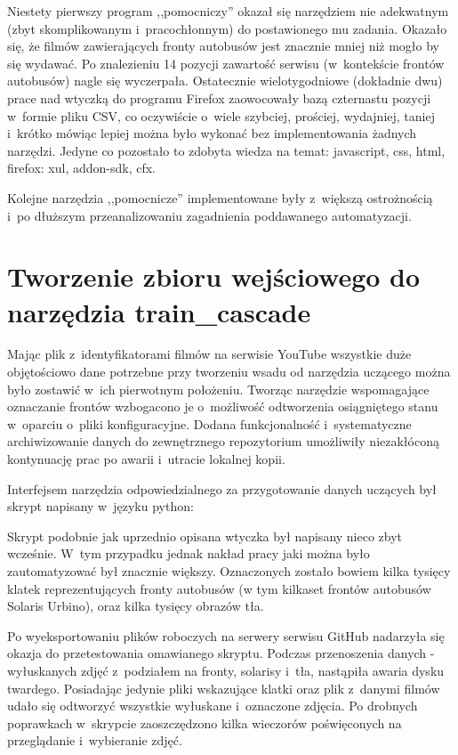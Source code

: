 Niestety pierwszy program ,,pomocniczy'' okazał się narzędziem nie
adekwatnym
(zbyt skomplikowanym i~pracochłonnym) do postawionego mu zadania. 
Okazało się, że
filmów zawierających fronty autobusów jest znacznie mniej niż mogło 
by się wydawać. Po znalezieniu 14 pozycji zawartość serwisu 
(w~kontekście frontów autobusów) nagle się
wyczerpała. Ostatecznie wielotygodniowe (dokładnie dwu) prace nad 
wtyczką do programu 
Firefox zaowocowały bazą czternastu pozycji w~formie pliku CSV,
co oczywiście o~wiele szybciej, prościej, wydajniej, taniej i~krótko 
mówiąc lepiej można
było wykonać bez implementowania żadnych narzędzi. 
Jedyne co pozostało to zdobyta wiedza
na temat: javascript, css, html, firefox: xul, addon-sdk, cfx. 

Kolejne narzędzia ,,pomocnicze'' implementowane były z~większą 
ostrożnością i~po
dłuższym przeanalizowaniu zagadnienia poddawanego automatyzacji.

\section{Tworzenie zbioru wejściowego do narzędzia train\_cascade}

Mając plik z~identyfikatorami filmów na serwisie YouTube wszystkie duże objętościowo
dane potrzebne przy tworzeniu wsadu od narzędzia uczącego można było zostawić
w~ich pierwotnym położeniu. Tworząc narzędzie wspomagające oznaczanie frontów
wzbogacono je o~możliwość odtworzenia osiągniętego stanu w~oparciu o~pliki konfiguracyjne.
Dodana funkcjonalność i~systematyczne archiwizowanie danych do zewnętrznego repozytorium
umożliwiły niezakłóconą kontynuację prac po awarii i~utracie lokalnej kopii.

Interfejsem narzędzia odpowiedzialnego za przygotowanie danych uczących był skrypt
napisany w~języku python:



Skrypt podobnie jak uprzednio opisana wtyczka był napisany 
nieco zbyt wcześnie. W~tym przypadku jednak nakład pracy jaki 
można było zautomatyzować był znacznie większy. Oznaczonych zostało 
bowiem kilka tysięcy klatek reprezentujących fronty autobusów
(w tym kilkaset frontów autobusów Solaris Urbino), oraz kilka tysięcy
obrazów tła. 

Po wyeksportowaniu plików roboczych na serwery serwisu GitHub
nadarzyła się okazja do przetestowania omawianego skryptu.
Podczas przenoszenia danych - wyłuskanych 
zdjęć z~podziałem na fronty, solarisy i~tła, nastąpiła awaria dysku
twardego. Posiadając jedynie pliki wskazujące klatki oraz plik 
z~danymi filmów udało się odtworzyć wszystkie wyłuskane i~oznaczone
zdjęcia. Po drobnych poprawkach w~skrypcie zaoszczędzono kilka wieczorów
poświęconych na przeglądanie i~wybieranie zdjęć.

